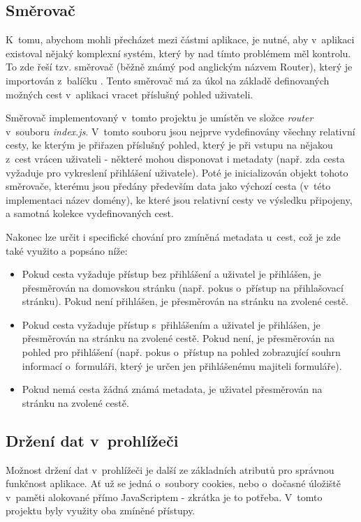 	\subsection{Směrovač}\label{sec:fe_router} %
	K~tomu, abychom mohli přecházet mezi částmi aplikace, je nutné, aby v~aplikaci existoval nějaký komplexní systém, který by nad tímto problémem měl kontrolu. To zde řeší tzv. směrovač (běžně známý pod anglickým názvem Router), který je importován z~balíčku . Tento směrovač má za úkol na základě definovaných možných cest v~aplikaci vracet příslušný pohled uživateli.
	
	Směrovač implementovaný v~tomto projektu je umístěn ve složce \textit{router} v~souboru \textit{index.js}. V~tomto souboru jsou nejprve vydefinovány všechny relativní cesty, ke kterým je přiřazen příslušný pohled, který je při vstupu na nějakou z~cest vrácen uživateli - některé mohou disponovat i metadaty (např. zda cesta vyžaduje pro vykreslení přihlášení uživatele). Poté je inicializován objekt tohoto směrovače, kterému jsou předány především data jako výchozí cesta (v~této implementaci název domény), ke které jsou relativní cesty ve výsledku připojeny, a samotná kolekce vydefinovaných cest. 
	
	Nakonec lze určit i specifické chování pro zmíněná metadata u~cest, což je zde také využito a popsáno níže:
	\begin{itemize}
		\item Pokud cesta vyžaduje přístup bez přihlášení a uživatel je přihlášen, je přesměrován na domovskou stránku (např. pokus o~přístup na přihlašovací stránku). Pokud není přihlášen, je přesměrován na stránku na zvolené cestě.
		\item Pokud cesta vyžaduje přístup s~přihlášením a uživatel je přihlášen, je přesměrován na stránku na zvolené cestě. Pokud není, je přesměrován na pohled pro přihlášení (např. pokus o~přístup na pohled zobrazující souhrn informací o~formuláři, který je určen jen přihlášenému majiteli formuláře).
		\item Pokud nemá cesta žádná známá metadata, je uživatel přesměrován na stránku na zvolené cestě.
	\end{itemize}

	\subsection{Držení dat v~prohlížeči} %
	Možnost držení dat v~prohlížeči je další ze základních atributů pro správnou funkčnost aplikace. Ať už se jedná o~soubory cookies, nebo o~dočasné úložiště v~paměti alokované přímo JavaScriptem - zkrátka je to potřeba. V~tomto projektu byly využity oba zmíněné přístupy.
	
